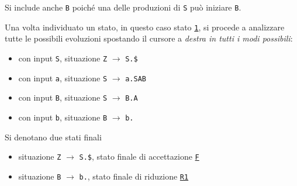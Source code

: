 Si include anche \texttt{B} poiché una delle produzioni di \texttt{S} può iniziare \texttt{B}.

Una volta individuato un stato, in questo caso stato \texttt{\underline{1}}, si procede a analizzare tutte le possibili evoluzioni spostando il cursore a \textit{destra in tutti i modi possibili}:

\begin{itemize}
    \item con input \texttt{S}, situazione \texttt{Z} $\rightarrow$ \texttt{S.\$}
    \item con input \texttt{a}, situazione \texttt{S} $\rightarrow$ \texttt{a.SAB}
    \item con input \texttt{B}, situazione \texttt{S} $\rightarrow$ \texttt{B.A}
    \item con input \texttt{b}, situazione \texttt{B} $\rightarrow$ \texttt{b.}
\end{itemize}
Si denotano due stati finali
\begin{itemize}
    \item situazione \texttt{Z} $\rightarrow$ \texttt{S.\$}, stato finale di accettazione \texttt{\underline{F}}
    \item situazione \texttt{B} $\rightarrow$ \texttt{b.}, stato finale di riduzione \texttt{\underline{R1}}
\end{itemize}

